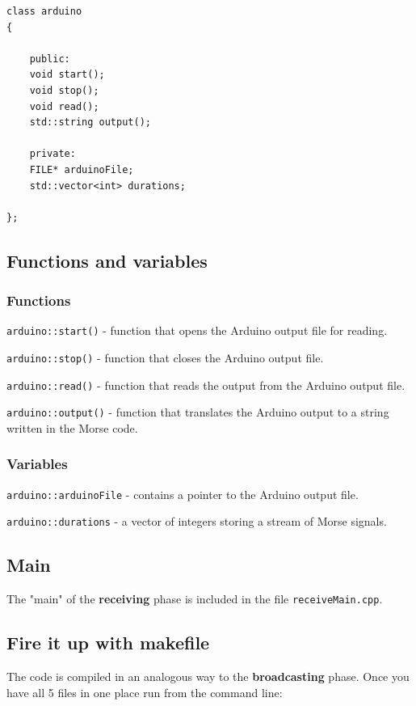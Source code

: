 \documentclass[12pt]{report}
\begin{document}
\begin{lstlisting}
class arduino
{

	public:
	void start();
	void stop();
	void read();
	std::string output();

	private:
	FILE* arduinoFile;
	std::vector<int> durations;
	
};
\end{lstlisting}

\subsection{Functions and variables}

\subsubsection{Functions}

\verb|arduino::start()| - function that opens the Arduino output file for reading.

\verb|arduino::stop()| - function that closes the Arduino output file.

\verb|arduino::read()| - function that reads the output from the Arduino output file.

\verb|arduino::output()| - function that translates the Arduino output to a string written in the Morse code.

\subsubsection{Variables}

\verb|arduino::arduinoFile| - contains a pointer to the Arduino output file.

\verb|arduino::durations| - a vector of integers storing a stream of Morse signals.

\subsection{Main}

The "main" of the \textbf{receiving} phase is included in the file \verb|receiveMain.cpp|. 

\subsection{Fire it up with makefile}

The code is compiled in an analogous way to the \textbf{broadcasting} phase. Once you have all 5 files in one place run from the command line:
\end{document}
